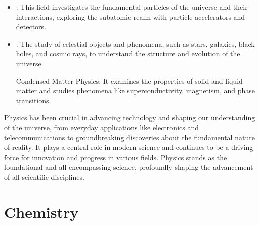 \begin{itemize}
	\item {}: This field investigates the fundamental particles of the universe and their interactions, exploring the subatomic realm with particle accelerators and detectors.

	\item {}: The study of celestial objects and phenomena, such as stars, galaxies, black holes, and cosmic rays, to understand the structure and evolution of the universe.

Condensed Matter Physics: It examines the properties of solid and liquid matter and studies phenomena like superconductivity, magnetism, and phase transitions.
\end{itemize}

Physics has been crucial in advancing technology and shaping our understanding of the universe, from everyday applications like electronics and telecommunications to groundbreaking discoveries about the fundamental nature of reality. It plays a central role in modern science and continues to be a driving force for innovation and progress in various fields. Physics stands as the foundational and all-encompassing science, profoundly shaping the advancement of all scientific disciplines.


\section{Chemistry}